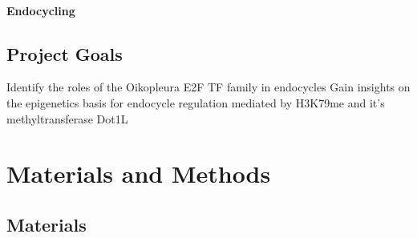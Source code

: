 \documentclass[11pt,twoside,a4paper]{report}
\begin{document}
		
		\subsubsection{Endocycling}
	
	
	\section{Project Goals}
		Identify the roles of the Oikopleura E2F TF family in endocycles
		Gain insights on the epigenetics basis for endocycle regulation mediated by H3K79me and it's methyltransferase Dot1L

\clearpage

\chapter{Materials and Methods}
	\section{Materials}
\end{document}
